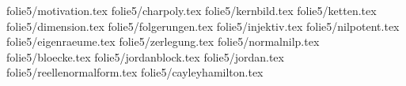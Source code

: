 %
%
%
folie{5/motivation.tex}
folie{5/charpoly.tex}
folie{5/kernbild.tex}
folie{5/ketten.tex}
folie{5/dimension.tex}
folie{5/folgerungen.tex}
folie{5/injektiv.tex}
folie{5/nilpotent.tex}
folie{5/eigenraeume.tex}
folie{5/zerlegung.tex}
folie{5/normalnilp.tex}
folie{5/bloecke.tex}
folie{5/jordanblock.tex}
folie{5/jordan.tex}
folie{5/reellenormalform.tex}
folie{5/cayleyhamilton.tex}
